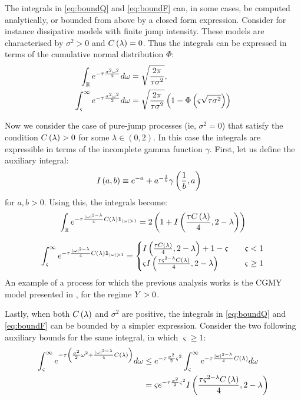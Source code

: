 \documentclass[11pt]{amsart}
\begin{document}
The integrals 
in \eqref{eq:boundQ} and \eqref{eq:boundF} can, in some cases, be computed analytically,
or bounded from above by a closed form expression.
Consider for instance dissipative models with finite jump intensity. 
These models are characterised by $\sigma^2>0$ and $C \left( {\lambda} \right)=0$. Thus the integrals can be expressed in terms of the cumulative normal distribution $\Phi$:
\begin{align}
\int_{\mathbb R} e^{-\tau \frac{\sigma^2 \omega^2}{2}}d\omega&=\sqrt{\frac{2 \pi}{\tau \sigma^2}},
\\
\int_{\varsigma}^\infty e^{-\tau \frac{\sigma^2 \omega^2}{2}} d \omega &= 
\sqrt{\frac{2 \pi}{\tau \sigma^2}}
\left( {1-\Phi \left( {\varsigma \sqrt{\tau \sigma^2}} \right)} \right)
\end{align}


Now we consider the case of pure-jump processes (ie, $\sigma^2 =0$) that satisfy the condition $C \left( {\lambda} \right) > 0$ for some $\lambda \in (0,2)$. 
In this case the integrals are expressible
in terms of the incomplete gamma function $\gamma$.
First, let us define the auxiliary integral:
\begin{align}
I \left( {a,b} \right) 
&\equiv
e^{-a} + a^{-\frac{1}{b}} \gamma \left( {\frac{1}{b},a} \right)
\nonumber
\end{align}
for $a,b>0$. Using this, the 
integrals become:
\begin{equation}
\int_{\R} \expfs{- \tau \frac{\absval{\omega}^{2-\lambda}}{4} \cl \mathbf{1}_{\absval{\omega}>1}}
= 2 \parent{1+ I \parent{\frac{\tau \cl}{4},2-\lambda}}
\end{equation}

\begin{equation}
\int_{\varsigma}^\infty \expfs{- \tau \frac{\absval{\omega}^{2-\lambda}}{4} \cl \mathbf{1}_{\absval{\omega}>1}}
= \begin{cases}
I \parent{\frac{\tau \cl}{4},2-\lambda} + 1-\varsigma & \quad \varsigma <1\\
\varsigma I \parent{\frac{\tau \varsigma^{2-\lambda}\cl}{4},2-\lambda} &\quad \varsigma \geq 1
\end{cases}
\end{equation}
An example of a process for which the previous analysis works
is the CGMY model presented in \cite{cgmy_fine,carr2003stochastic}, for the regime $Y > 0$.

Lastly, when both $C \left( {\lambda} \right)$ and $\sigma^2$ are positive, 
the integrals in \eqref{eq:boundQ} and \eqref{eq:boundF} can be bounded by a simpler expression. 
Consider the two following auxiliary bounds for the same integral, in which $\varsigma\geq 1$:
\begin{align}
\int_{\varsigma}^\infty e^{-\tau \left( { \frac{\sigma^2}{2}\omega^2 + \frac{|\omega|^{2 - \lambda}}{4} C \left( {\lambda} \right)} \right) } d\omega
& \leq e^{-\tau \frac{\sigma^2}{2}\varsigma^2} \int_{\varsigma}^\infty e^{-\tau \frac{|\omega|^{2 - \lambda}}{4} C \left( {\lambda} \right)} d\omega \\
& = \varsigma e^{-\tau \frac{\sigma^2}{2}\varsigma^2}  I \left( {\frac{\tau \varsigma^{2-\lambda}C \left( {\lambda} \right)}{4},2-\lambda} \right) \notag
\end{align}
\end{document}
